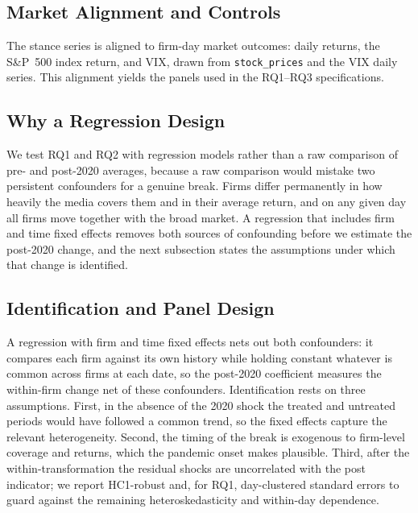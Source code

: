 \documentclass[conference]{IEEEtran}
\begin{document}
\subsection{Market Alignment and Controls}
The stance series is aligned to firm-day market outcomes: daily returns, the
S\&P~500 index return, and VIX, drawn from \texttt{stock\_prices} and the VIX
daily series. This alignment yields the panels used in the RQ1--RQ3
specifications.


\label{sec:method}

\subsection{Why a Regression Design}
We test RQ1 and RQ2 with regression models rather than a raw comparison of pre- and
post-2020 averages, because a raw comparison would mistake two persistent confounders
for a genuine break. Firms differ permanently in how heavily the media covers them and
in their average return, and on any given day all firms move together with the broad
market. A regression that includes firm and time fixed effects removes both sources of
confounding before we estimate the post-2020 change, and the next subsection states the
assumptions under which that change is identified.

\subsection{Identification and Panel Design}
A regression with firm and time fixed effects nets out both confounders: it compares
each firm against its own history while holding constant whatever is common across
firms at each date, so the post-2020 coefficient measures the within-firm change
net of these confounders. Identification rests on three assumptions. First, in the
absence of the 2020 shock the treated and untreated periods would have followed a
common trend, so the fixed effects capture the relevant heterogeneity. Second, the
timing of the break is exogenous to firm-level coverage and returns, which the
pandemic onset makes plausible. Third, after the within-transformation the residual
shocks are uncorrelated with the post indicator; we report HC1-robust and, for RQ1,
day-clustered standard errors to guard against the remaining heteroskedasticity and
within-day dependence.
\end{document}

